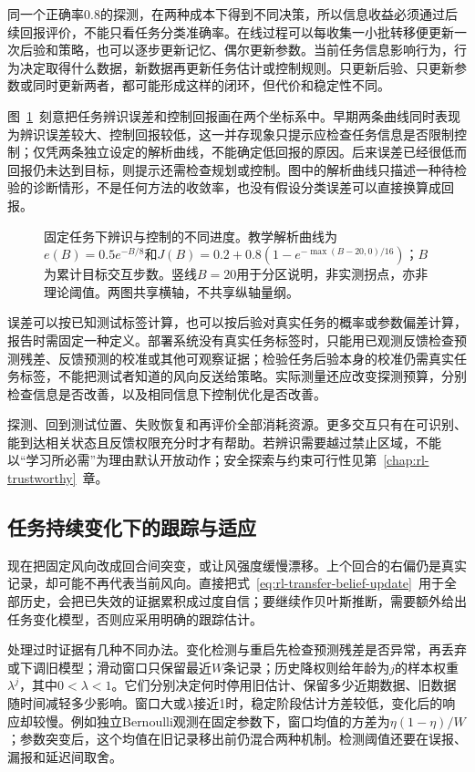 同一个正确率$0.8$的探测，在两种成本下得到不同决策，所以信息收益必须通过后续回报评价，不能只看任务分类准确率。在线过程可以每收集一小批转移便更新一次后验和策略，也可以逐步更新记忆、偶尔更新参数。当前任务信息影响行为，行为决定取得什么数据，新数据再更新任务估计或控制规则。只更新后验、只更新参数或同时更新两者，都可能形成这样的闭环，但代价和稳定性不同。

图~\ref{fig:rl-transfer-identification-curves}~刻意把任务辨识误差和控制回报画在两个坐标系中。早期两条曲线同时表现为辨识误差较大、控制回报较低，这一并存现象只提示应检查任务信息是否限制控制；仅凭两条独立设定的解析曲线，不能确定低回报的原因。后来误差已经很低而回报仍未达到目标，则提示还需检查规划或控制。图中的解析曲线只描述一种待检验的诊断情形，不是任何方法的收敛率，也没有假设分类误差可以直接换算成回报。

\begin{figure}[htbp]
 \centering
 
 \caption{固定任务下辨识与控制的不同进度。教学解析曲线为$e(B)=0.5e^{-B/8}$和$J(B)=0.2+0.8(1-e^{-\max(B-20,0)/16})$；$B$为累计目标交互步数。竖线$B=20$用于分区说明，非实测拐点，亦非理论阈值。两图共享横轴，不共享纵轴量纲。}
 \label{fig:rl-transfer-identification-curves}
\end{figure}

误差可以按已知测试标签计算，也可以按后验对真实任务的概率或参数偏差计算，报告时需固定一种定义。部署系统没有真实任务标签时，只能用已观测反馈检查预测残差、反馈预测的校准或其他可观察证据；检验任务后验本身的校准仍需真实任务标签，不能把测试者知道的风向反送给策略。实际测量还应改变探测预算，分别检查信息是否改善，以及相同信息下控制优化是否改善。

探测、回到测试位置、失败恢复和再评价全部消耗资源。更多交互只有在可识别、能到达相关状态且反馈权限充分时才有帮助。若辨识需要越过禁止区域，不能以“学习所必需”为理由默认开放动作；安全探索与约束可行性见第~\ref{chap:rl-trustworthy}~章。

\subsection{任务持续变化下的跟踪与适应}
\label{sec:rl-transfer-tracking}

现在把固定风向改成回合间突变，或让风强度缓慢漂移。上个回合的右偏仍是真实记录，却可能不再代表当前风向。直接把式~\eqref{eq:rl-transfer-belief-update}~用于全部历史，会把已失效的证据累积成过度自信；要继续作贝叶斯推断，需要额外给出任务变化模型，否则应采用明确的跟踪估计。

处理过时证据有几种不同办法。变化检测与重启先检查预测残差是否异常，再丢弃或下调旧模型；滑动窗口只保留最近$W$条记录；历史降权则给年龄为$j$的样本权重$\lambda^j$，其中$0<\lambda<1$。它们分别决定何时停用旧估计、保留多少近期数据、旧数据随时间减轻多少影响。窗口大或$\lambda$接近1时，稳定阶段估计方差较低，变化后的响应却较慢。例如独立Bernoulli观测在固定参数下，窗口均值的方差为$\eta(1-\eta)/W$；参数突变后，这个均值在旧记录移出前仍混合两种机制。检测阈值还要在误报、漏报和延迟间取舍。


